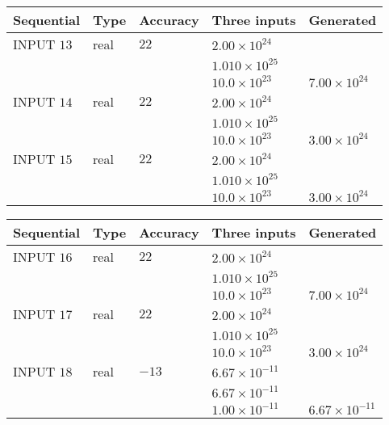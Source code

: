 \documentclass[12pt]{article}
\begin{document}
   
  
  
\noindent\begin{tabular}{|l|l|l|l|l|}
\hline
 Sequential & Type & Accuracy & Three inputs & Generated \\ 
\hline
 
 
  INPUT $          13$ & real & $          22 $ & $
 2.00 \times 10^{24}
  $ & \\
  & & &  $
 1.010 \times 10^{25}
  $ & \\
  & & &  $
 10.0 \times 10^{23}
 $ & $ 7.00 \times 10^{24} $ 
 \\  \hline  
 
 
  INPUT $          14$ & real & $          22 $ & $
 2.00 \times 10^{24}
  $ & \\
  & & &  $
 1.010 \times 10^{25}
  $ & \\
  & & &  $
 10.0 \times 10^{23}
 $ & $ 3.00 \times 10^{24} $ 
 \\  \hline  
 
 
  INPUT $          15$ & real & $          22 $ & $
 2.00 \times 10^{24}
  $ & \\
  & & &  $
 1.010 \times 10^{25}
  $ & \\
  & & &  $
 10.0 \times 10^{23}
 $ & $ 3.00 \times 10^{24} $ 
 \\  \hline  
 \end{tabular}
   
   
  
  
\noindent\begin{tabular}{|l|l|l|l|l|}
\hline
 Sequential & Type & Accuracy & Three inputs & Generated \\ 
\hline
 
 
  INPUT $          16$ & real & $          22 $ & $
 2.00 \times 10^{24}
  $ & \\
  & & &  $
 1.010 \times 10^{25}
  $ & \\
  & & &  $
 10.0 \times 10^{23}
 $ & $ 7.00 \times 10^{24} $ 
 \\  \hline  
 
 
  INPUT $          17$ & real & $          22 $ & $
 2.00 \times 10^{24}
  $ & \\
  & & &  $
 1.010 \times 10^{25}
  $ & \\
  & & &  $
 10.0 \times 10^{23}
 $ & $ 3.00 \times 10^{24} $ 
 \\  \hline  
 
 
  INPUT $          18$ & real & $         -13 $ & $
 6.67 \times 10^{-11}
  $ & \\
  & & &  $
 6.67 \times 10^{-11}
  $ & \\
  & & &  $
 1.00 \times 10^{-11}
 $ & $ 6.67 \times 10^{-11} $ 
 \\  \hline  
 \end{tabular}
   
\end{document}
